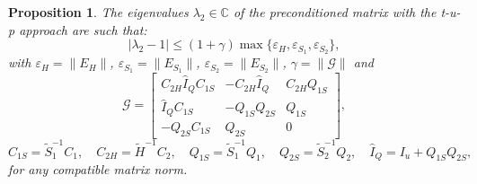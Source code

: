 \documentclass[10pt,a4paper]{amsart}
\newtheorem{prop}{Proposition}
\newcommand{\tH}{\widetilde{H}}
\newcommand{\tS}{\widetilde{S}}
\begin{document}
\begin{prop}
\label{thm:eig_tup}
The eigenvalues $\lambda_2\in\mathbb{C}$ of the preconditioned matrix with the t-u-p approach are such that:
\begin{equation}
    |\lambda_2-1| \leq (1+\gamma) \max\{\varepsilon_H,\varepsilon_{S_1}, \varepsilon_{S_2}\},
    \label{eq:eigbound2}
\end{equation}
with $\varepsilon_H=\|E_H\|$, $\varepsilon_{S_1}=\|E_{S_1}\|$, $\varepsilon_{S_2}=\|E_{S_2}\|$, $\gamma=\|\mathcal{G}\|$ and
\begin{equation}
    \mathcal{G} = \left[ \begin{array}{ccc}
    C_{2H}\hat{I}_QC_{1S} & -C_{2H}\hat{I}_Q & C_{2H}Q_{1S} \\
    \hat{I}_QC_{1S} & -Q_{1S}Q_{2S} & Q_{1S} \\
    -Q_{2S}C_{1S} & Q_{2S} & 0 \end{array} \right], 
    \label{eq:Gdef}
\end{equation}
\begin{equation}
    C_{1S} = \tS_1^{-1}C_1, \quad C_{2H} = \tH^{-1}C_2, \quad Q_{1S} = \tS_1^{-1}Q_1, \quad Q_{2S} = \tS_2^{-1}Q_2, \quad \hat{I}_Q = I_u + Q_{1S}Q_{2S},
    \label{eq:matdef}
\end{equation}
for any compatible matrix norm.
\end{prop}
\end{document}
